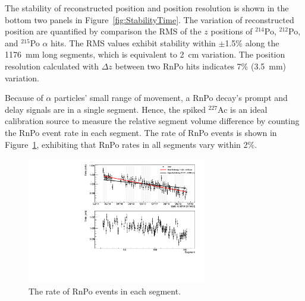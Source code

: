 The stability of reconstructed position and position resolution is shown in the bottom two panels in Figure~\ref{fig:StabilityTime}.
The variation of reconstructed position are quantified by comparison the RMS of the $z$ positions of $^{214}$Po, $^{212}$Po, and $^{215}$Po $\alpha$ hits.
The RMS values exhibit stability within $\pm$1.5\% along the 1176~mm long segments, which is equivalent to 2~cm variation.
The position resolution calculated with $\Delta z$ between two RnPo hits indicates 7\% (3.5~mm) variation.


Because of $\alpha$ particles' small range of movement, a RnPo decay's prompt and delay signals are in a single segment.
Hence, the spiked $^{227}$Ac is an ideal calibration source to measure the relative segment volume difference by counting the RnPo event rate in each segment.
The rate of RnPo events is shown in Figure~\ref{fig:RnPoRate}, exhibiting that RnPo rates in all segments vary within 2\%.
\begin{figure}[h!]
\centering
\includegraphics[width=0.7\textwidth]{Figures/RnPoRate.pdf}
\caption[RnPo rate per segment ]{
The rate of RnPo events in each segment.}
\label{fig:RnPoRate}
\end{figure}

